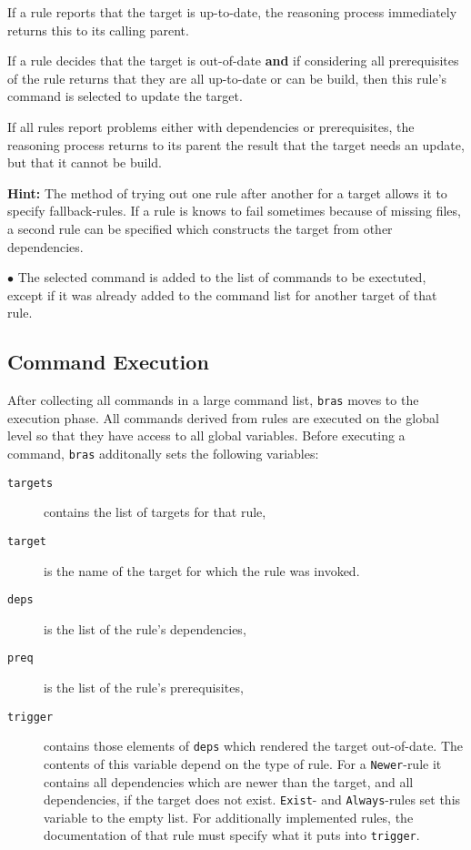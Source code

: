\documentclass[12pt]{article}
\newcommand{\bras}{\texttt{bras}}
\begin{document}
{If a rule reports that the target is up-to-date,
the reasoning process immediately returns this to its calling parent.

If a rule decides that the target is out-of-date \textbf{and} if
considering all prerequisites of the rule returns that they are all
up-to-date or can be build, then this rule's command is selected to
update the target.

If all rules report problems either with dependencies or
prerequisites, the reasoning process returns to its parent the result
that the target needs an update, but that it cannot be build.

\textbf{Hint:} The method of trying out one rule after another for a target allows it
to specify fallback-rules. If a rule is knows to fail sometimes
because of missing files, a second rule can be specified which
constructs the target from other dependencies.

$\bullet$ The selected command is added to the list of commands to be
exectuted, except if it was already added to the command
list for another target of that rule.

\subsection{Command Execution}
\label{secCmdExec}

After collecting all commands in a large command list, \bras{} moves
to the execution phase. All commands derived from rules are executed
on the global level so that they have access to all global
variables. Before executing a command, \bras{} additonally sets the
following variables:

\begin{description}
\item[\texttt{targets}] 
contains the list of targets for that rule,

\item[\texttt{target}] 
is the name of the target for which the rule
was invoked.

\item[\texttt{deps}] 
is the list of the rule's dependencies,

\item[\texttt{preq}] 
is the list of the rule's prerequisites,

\item[\texttt{trigger}]
contains those elements of \texttt{deps} which rendered the target
out-of-date. The contents of this variable depend on the type of
rule. For a \texttt{Newer}-rule it contains all dependencies which are
newer than the target, and all dependencies, if the target does not
exist. \texttt{Exist}- and \texttt{Always}-rules set this variable to
the empty list. For additionally implemented rules, the documentation
of that rule must specify what it puts into \texttt{trigger}.
\end{description}

}
\end{document}
